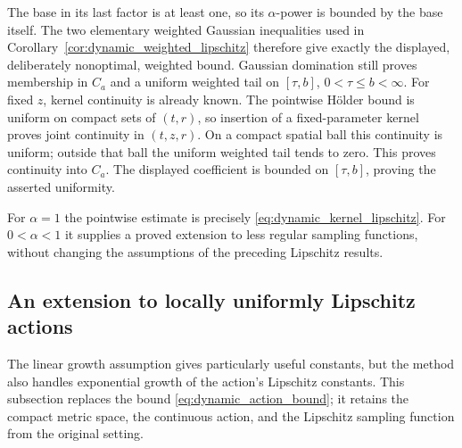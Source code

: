 The base in its last factor is at least one, so its $\alpha$-power
is bounded by the base itself. The two elementary weighted Gaussian
inequalities used in Corollary~\ref{cor:dynamic_weighted_lipschitz}
therefore give exactly the displayed, deliberately nonoptimal, weighted
bound. Gaussian domination still proves membership in $C_a$ and a
uniform weighted tail on $[\tau,b]$, $0<\tau\leq b<\infty$.
For fixed $z$, kernel continuity is already known. The pointwise
H\"older bound is uniform on compact sets of $(t,r)$, so insertion of
a fixed-parameter kernel proves joint continuity in $(t,z,r)$.
On a compact spatial ball this continuity is uniform; outside that
ball the uniform weighted tail tends to zero. This proves continuity
into $C_a$. The displayed coefficient is bounded on $[\tau,b]$,
proving the asserted uniformity.
\Done

For $\alpha=1$ the pointwise estimate is precisely
\eqref{eq:dynamic_kernel_lipschitz}. For $0<\alpha<1$ it supplies a
proved extension to less regular sampling functions, without changing
the assumptions of the preceding Lipschitz results.

\subsection{An extension to locally uniformly Lipschitz actions}
The linear growth assumption gives particularly useful constants, but
the method also handles exponential growth of the action's Lipschitz
constants. This subsection replaces the bound \eqref{eq:dynamic_action_bound};
it retains the compact metric space, the continuous action, and the
Lipschitz sampling function from the original setting.

